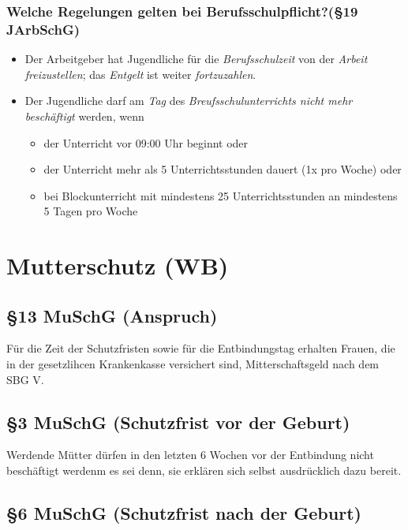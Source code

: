 \documentclass[a4paper, 12pt]{report}
\begin{document}
\subsubsection{Welche Regelungen gelten bei Berufsschulpflicht?(\S 19 JArbSchG)}
\begin{itemize}
    \item Der Arbeitgeber hat Jugendliche für die \emph{Berufsschulzeit} von der
        \emph{Arbeit freizustellen}; das \emph{Entgelt} ist weiter 
        \emph{fortzuzahlen}. 
    \item Der Jugendliche darf am \emph{Tag} des \emph{Breufsschulunterrichts 
        nicht mehr beschäftigt} werden, wenn
        \begin{itemize}
            \item der Unterricht vor 09:00 Uhr beginnt oder
            \item der Unterricht mehr als 5 Unterrichtsstunden dauert (1x pro 
                Woche) oder
            \item bei Blockunterricht mit mindestens 25 Unterrichtsstunden an 
                mindestens 5 Tagen pro Woche
        \end{itemize}
\end{itemize}

\section{Mutterschutz (WB)}

\subsection{\S 13 MuSchG (Anspruch)}

Für die Zeit der Schutzfristen sowie für die Entbindungstag erhalten Frauen, die
in der gesetzlihcen Krankenkasse versichert sind, Mitterschaftsgeld nach dem SBG
V.

\subsection{\S 3 MuSchG (Schutzfrist vor der Geburt)}

Werdende Mütter dürfen in den letzten 6 Wochen vor der Entbindung nicht 
beschäftigt werdenm es sei denn, sie erklären sich selbst ausdrücklich dazu 
bereit.

\subsection{\S 6 MuSchG (Schutzfrist nach der Geburt)}
\end{document}
